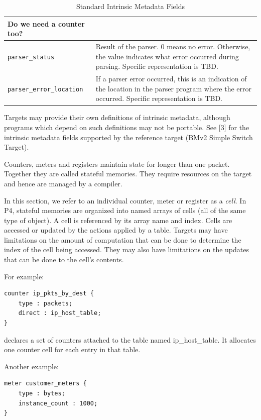\documentclass[12pt]{article}
\begin{document}
\begin{table}[H]
\begin{center}
\begin{tabular}{| l | p{} |}
Do we need a counter too?  \\ \hline
\texttt{parser_status} &
Result of the parser. 0 means no error. Otherwise, the value indicates what 
error occurred during parsing. Specific representation is TBD. \\ \hline
\texttt{parser_error_location} &
If a parser error occurred, this is an indication of the location in the parser 
program where the error occurred. Specific representation is TBD. \\ \hline
\end{tabular}
\end{center}
\caption{Standard Intrinsic Metadata Fields}
\label{tab:stanmetadata}
\end{table}

Targets may provide their own definitions of intrinsic metadata, although 
programs which depend on such definitions may not be portable. 
{\color{red} See [3] for the intrinsic metadata fields supported by the reference target (BMv2 Simple Switch Target).}


Counters, meters and registers maintain state for longer than one packet. 
Together they are called stateful memories. They require resources on the 
target and hence are managed by a compiler.

In this section, we refer to an individual counter, meter or register as a 
\textit{cell}. In P4, stateful memories are organized into named arrays of cells 
(all of the same type of object). A cell is referenced by its array name and 
index. Cells are accessed or updated by the actions applied by a table. Targets 
may have limitations on the amount of computation that can be done to determine 
the index of the cell being accessed.  They may also have limitations on 
the updates that can be done to the cell's contents.

For example:

\begin{lstlisting}[keywords={},frame=single,escapechar=\@]
counter ip_pkts_by_dest {
    type : packets;
    direct : ip_host_table;
}
\end{lstlisting}


declares a set of counters attached to the table named ip_host_table. It 
allocates one counter cell for each entry in that table.

Another example:

\begin{lstlisting}[keywords={},frame=single,escapechar=\@]
meter customer_meters {
    type : bytes;
    instance_count : 1000;
}
\end{lstlisting}
\end{document}
